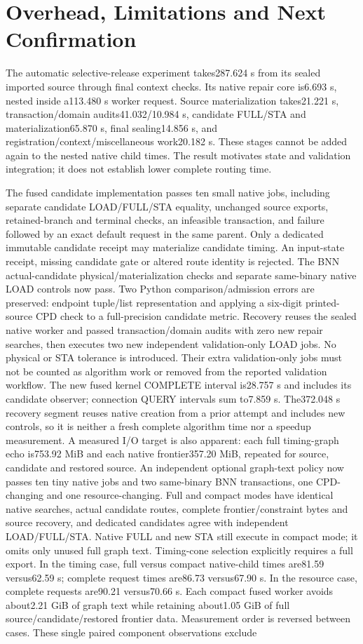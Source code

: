 \documentclass[conference,10pt]{IEEEtran}
\begin{document}
\section{Overhead, Limitations and Next Confirmation}
The automatic selective-release experiment takes287.624 s from its sealed imported source through final context checks. Its native repair core is6.693 s, nested inside a113.480 s worker request. Source materialization takes21.221 s, transaction/domain audits41.032/10.984 s, candidate FULL/STA and materialization65.870 s, final sealing14.856 s, and registration/context/miscellaneous work20.182 s. These stages cannot be added again to the nested native child times. The result motivates state and validation integration; it does not establish lower complete routing time.

The fused candidate implementation passes ten small native jobs, including separate candidate LOAD/FULL/STA equality, unchanged source exports, retained-branch and terminal checks, an infeasible transaction, and failure followed by an exact default request in the same parent. Only a dedicated immutable candidate receipt may materialize candidate timing. An input-state receipt, missing candidate gate or altered route identity is rejected. The BNN actual-candidate physical/materialization checks and separate same-binary native LOAD controls now pass. Two Python comparison/admission errors are preserved: endpoint tuple/list representation and applying a six-digit printed-source CPD check to a full-precision candidate metric. Recovery reuses the sealed native worker and passed transaction/domain audits with zero new repair searches, then executes two new independent validation-only LOAD jobs. No physical or STA tolerance is introduced. Their extra validation-only jobs must not be counted as algorithm work or removed from the reported validation workflow. The new fused kernel COMPLETE interval is28.757 s and includes its candidate observer; connection QUERY intervals sum to7.859 s. The372.048 s recovery segment reuses native creation from a prior attempt and includes new controls, so it is neither a fresh complete algorithm time nor a speedup measurement. A measured I/O target is also apparent: each full timing-graph echo is753.92 MiB and each native frontier357.20 MiB, repeated for source, candidate and restored source. An independent optional graph-text policy now passes ten tiny native jobs and two same-binary BNN transactions, one CPD-changing and one resource-changing. Full and compact modes have identical native searches, actual candidate routes, complete frontier/constraint bytes and source recovery, and dedicated candidates agree with independent LOAD/FULL/STA. Native FULL and new STA still execute in compact mode; it omits only unused full graph text. Timing-cone selection explicitly requires a full export. In the timing case, full versus compact native-child times are81.59 versus62.59 s; complete request times are86.73 versus67.90 s. In the resource case, complete requests are90.21 versus70.66 s. Each compact fused worker avoids about2.21 GiB of graph text while retaining about1.05 GiB of full source/candidate/restored frontier data. Measurement order is reversed between cases. These single paired component observations exclude 
\end{document}
